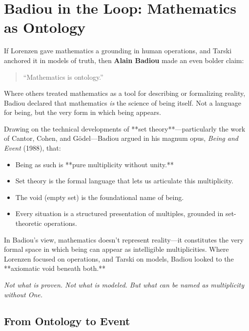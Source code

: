 \section{Badiou in the Loop: Mathematics as Ontology}

If Lorenzen gave mathematics a grounding in human operations, and Tarski anchored it in models of truth, then \textbf{Alain Badiou} made an even bolder claim:

\begin{quote}
    “Mathematics is ontology.”
\end{quote}

Where others treated mathematics as a tool for describing or formalizing reality, Badiou declared that mathematics \emph{is} the science of being itself. Not a language for being, but the very form in which being appears.

Drawing on the technical developments of **set theory**—particularly the work of Cantor, Cohen, and Gödel—Badiou argued in his magnum opus, \emph{Being and Event} (1988), that:

\begin{itemize}
  \item Being as such is **pure multiplicity without unity.**
  \item Set theory is the formal language that lets us articulate this multiplicity.
  \item The void (empty set) is the foundational name of being.
  \item Every situation is a structured presentation of multiples, grounded in set-theoretic operations.
\end{itemize}

In Badiou’s view, mathematics doesn’t represent reality—it constitutes the very formal space in which being can appear as intelligible multiplicities. Where Lorenzen focused on operations, and Tarski on models, Badiou looked to the **axiomatic void beneath both.**

\begin{center}
    \textit{Not what is proven. Not what is modeled. But what can be named as multiplicity without One.}
\end{center}

\vspace{1em}

\subsection{From Ontology to Event}

